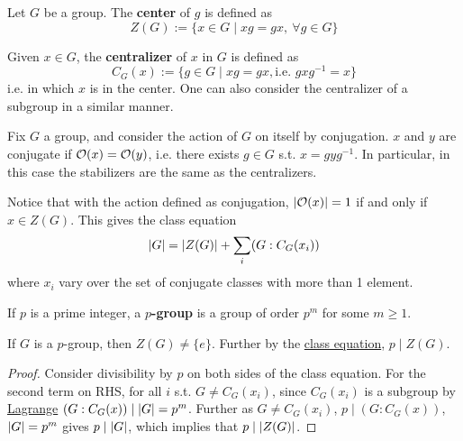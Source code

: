 \documentclass{article}
\begin{document}
\begin{definition}[Center]
    Let $G$ be a group. The \textbf{center} of $g$ is defined as
    \[
        Z(G) := \{ x \in G \mid xg = gx,\ \forall g \in G \}
    \]
\end{definition}

\begin{definition}[Centralizer]
    Given $x \in G$, the \textbf{centralizer} of $x$ in $G$ is defined as
    \[
        C_G(x) := \{ g \in G \mid xg = gx, \text{i.e. }gxg^{-1} = x \}
    \]
    i.e. in which $x$ is in the center. One can also consider the centralizer of a subgroup in a similar manner. 
\end{definition}

\begin{example}
    Fix $G$ a group, and consider the action of $G$ on itself by conjugation. $x$ and $y$ are conjugate if $\mathcal{O}(x) = \mathcal{O}(y)$, i.e. there exists $g \in G$ s.t. $x = gyg^{-1}$. In particular, in this case the stabilizers are the same as the centralizers.

    Notice that with the action defined as conjugation, $\left|\mathcal{O}(x)\right| = 1$ if and only if $x \in Z(G)$. This gives the class equation 
    \begin{equation}\label{eq: class equation}
        \left|G\right| = \left|Z(G)\right| + \sum_i (G : C_G(x_i))
    \end{equation}
    where $x_i$ vary over the set of conjugate classes with more than 1 element. 
\end{example}

\begin{definition}[$p$-group]
    If $p$ is a prime integer, a \textbf{$p$-group} is a group of order $p^m$ for some $m \geq 1$.
\end{definition}

\begin{proposition}\label{prop: center of p group has order divisible by p}
    If $G$ is a $p$-group, then $Z(G) \neq \{e\}$. Further by the \hyperref[eq: class equation]{class equation}, $p \mid Z(G)$.
\end{proposition}

\begin{proof}
    Consider divisibility by $p$ on both sides of the class equation. For the second term on RHS, for all $i$ s.t. $G \neq C_G(x_i)$, since $C_G(x_i)$ is a subgroup by \hyperref[thm: Lagrange]{Lagrange} $(G : C_G(x)) \mid \left|G\right| = p^m$. Further as $G \neq C_G(x_i)$, $p \mid (G : C_G(x))$, $\left|G\right| = p^m$ gives $p \mid \left|G\right|$, which implies that $p \mid \left|Z(G)\right|$.
\end{proof}
\end{document}
